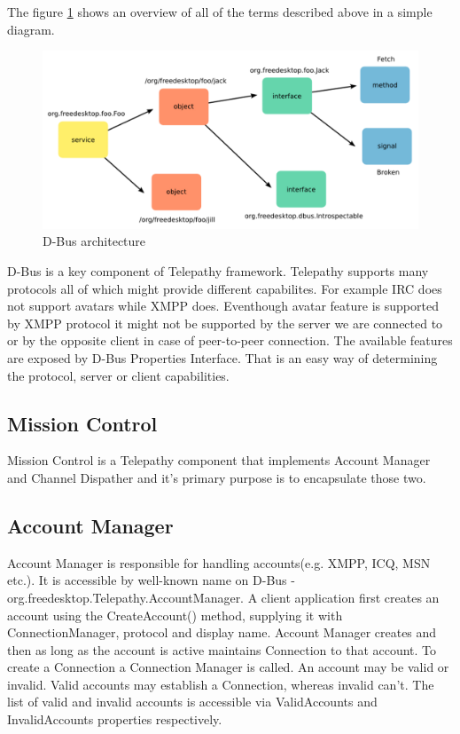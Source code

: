 The figure \ref{fig:dbusArchitecture} shows an overview of all of the terms described above in a simple diagram.

\begin{figure}[ht]
\begin{center}
	\includegraphics[width=15cm]{fig/dbus-architecture-overview.png}
	\caption{D-Bus architecture\cite{dbusTP}}
	\label{fig:dbusArchitecture}
\end{center}
\end{figure}

D-Bus is a key component of Telepathy framework. Telepathy supports many protocols all of which might provide different capabilites. For example IRC does not support avatars while XMPP does. Eventhough avatar feature is supported by XMPP protocol it might not be supported by the server we are connected to or by the opposite client in case of peer-to-peer connection. The available features are exposed by D-Bus Properties Interface. That is an easy way of determining the protocol, server or client capabilities.\cite{dbus}

\subsection*{Mission Control}
Mission Control is a Telepathy component that implements Account Manager and Channel Dispather and it's primary purpose is to encapsulate those two.\cite{tpWikiMissionControl}\cite{tpWikiBasicTerminology}

\subsection*{Account Manager}
Account Manager is responsible for handling accounts(e.g. XMPP, ICQ, MSN etc.). It is accessible by well-known name on D-Bus - org.freedesktop.Telepathy.AccountManager. A client application first creates an account using the CreateAccount() method, supplying it with ConnectionManager, protocol and display name. Account Manager creates and then as long as the account is active maintains Connection to that account. To create a Connection a Connection Manager is called. An account may be valid or invalid. Valid accounts may establish a Connection, whereas invalid can't. The list of valid and invalid accounts is accessible via ValidAccounts and InvalidAccounts properties respectively.\cite{tpWikiBasicTerminology}\cite{tpWikiAccountManager} 

